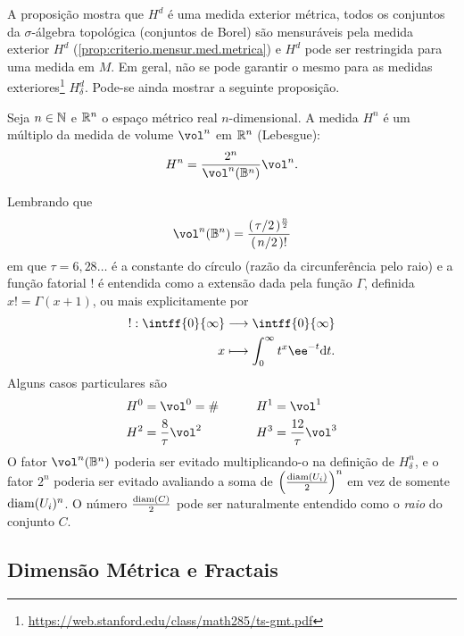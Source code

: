 A proposição mostra que $H^d$ é uma medida exterior métrica, todos os conjuntos da $\sigma$-álgebra topológica (conjuntos de Borel) são mensuráveis pela medida exterior $H^d$ (\ref{prop:criterio.mensur.med.metrica}) e $H^d$ pode ser restringida para uma medida em $M$. Em geral, não se pode garantir o mesmo para as medidas exteriores\footnote{\url{https://web.stanford.edu/class/math285/ts-gmt.pdf}} $H^d_\delta$. Pode-se ainda mostrar a seguinte proposição.

\begin{prop}
Seja $n \in \mathbb{N}$ e $\mathbb{R}^n$ o espaço métrico real $n$-dimensional. A medida $H^n$ é um múltiplo da medida de volume  $\vol^n$ em $\mathbb{R}^n$ (Lebesgue):
	\begin{equation*}
	H^n = \frac{2^n}{\vol^n(\mathbb B^n)}\vol^n.
	\end{equation*}
\end{prop}

Lembrando que
	\begin{equation*}
	\vol^n(\mathbb B^n) = \frac{(\quo{\tau}{2})^{\frac{n}{2}}}{\left( \quo{n}{2} \right)!}
	\end{equation*}
em que $\tau = 6,28\ldots$ é a constante do círculo (razão da circunferência pelo raio) e a função fatorial $!$ é entendida como a extensão dada pela função $\Gamma$, definida $x! = \Gamma(x+1)$, ou mais explicitamente por
	\begin{align*}
	\func{!}{\intff{0}{\infty}}{\intff{0}{\infty}}{x}{\int_0^\infty t^x \ee^{-t} \dd t.}
	\end{align*}
Alguns casos particulares são
	\begin{align*}
	H^0 &= \vol^0 = \# &&\qquad	H^1 = \vol^1 \\
	H^2 &= \frac{8}{\tau}\vol^2 &&\qquad H^3 = \frac{12}{\tau}\vol^3
	\end{align*}
O fator $\vol^n(\mathbb{B}^n)$ poderia ser evitado multiplicando-o na definição de $H^n_\delta$, e o fator $2^n$ poderia ser evitado avaliando a soma de $\left (\frac{\operatorname{diam}(U_i)}{2}\right )^n$ em vez de somente $\operatorname{diam}(U_i)^n$. O número $\frac{\operatorname{diam}(C)}{2}$ pode ser naturalmente entendido como o \emph{raio} do conjunto $C$.

\subsection{Dimensão Métrica e Fractais}

